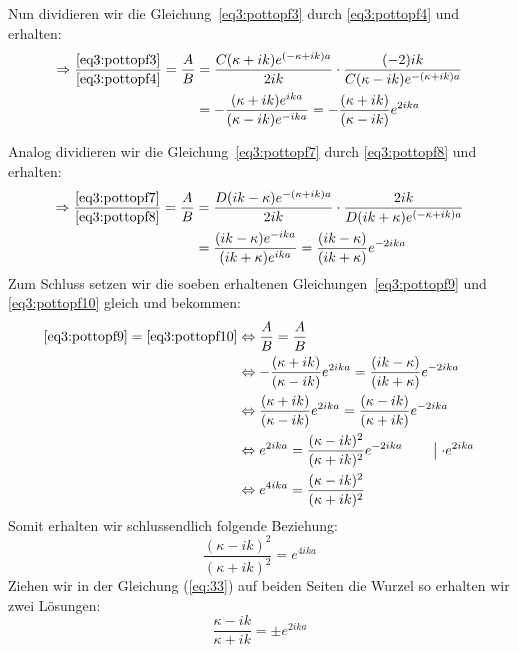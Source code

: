 Nun dividieren wir die Gleichung~\eqref{eq3:pottopf3} durch \eqref{eq3:pottopf4}
und erhalten:
\begin{align}
    \Rightarrow
    \frac{\eqref{eq3:pottopf3}}{\eqref{eq3:pottopf4}} 
    = \frac A B
    &=\frac{C(\kappa+ik)e^{(-\kappa +ik)a}}{2ik} \cdot
    \frac{(-2)ik}{C(\kappa-ik)e^{-(\kappa+ik)a}}\label{eq3:pottopf9}\\
    &=-\frac{(\kappa+ik)e^{ika}}{(\kappa-ik)e^{-ika}}
    =-\frac{(\kappa+ik)}{(\kappa-ik)}e^{2ika}\notag
\end{align}

Analog dividieren wir die Gleichung~\eqref{eq3:pottopf7} durch
\eqref{eq3:pottopf8} und erhalten:
\begin{align}
    \Rightarrow
    \frac{\eqref{eq3:pottopf7}}{\eqref{eq3:pottopf8}} 
    = \frac A B
    &=\frac{D(ik-\kappa)e^{-(\kappa +ik)a}}{2ik} \cdot
    \frac{2ik}{D(ik+\kappa)e^{(-\kappa+ik)a}}\label{eq3:pottopf10}\\
    &=\frac{(ik-\kappa)e^{-ika}}{(ik+\kappa)e^{ika}}
    =\frac{(ik-\kappa)}{(ik+\kappa)}e^{-2ika}\notag
\end{align}
Zum Schluss setzen wir die soeben erhaltenen Gleichungen~\eqref{eq3:pottopf9}
und \eqref{eq3:pottopf10} gleich und bekommen:
\begin{align*}
  \eqref{eq3:pottopf9}=\eqref{eq3:pottopf10}
  &\Leftrightarrow \frac A B = \frac A B\\
   &\Leftrightarrow -\frac{(\kappa+ik)}{(\kappa-ik)}e^{2ika}
      = \frac{(ik-\kappa)}{(ik+\kappa)}e^{-2ika}\\
   &\Leftrightarrow \frac{(\kappa+ik)}{(\kappa-ik)}e^{2ika}
      = \frac{(\kappa-ik)}{(\kappa+ik)}e^{-2ika}\\
   &\Leftrightarrow e^{2ika}
   = \frac{(\kappa-ik)^2}{(\kappa+ik)^2}e^{-2ika}
   \qquad \left|\;\cdot e^{2ika}\right.\\
   &\Leftrightarrow e^{4ika}
   = \frac{(\kappa-ik)^2}{(\kappa+ik)^2}
\end{align*}
Somit erhalten wir schlussendlich folgende Beziehung:
\begin{equation}
  \label{eq:33}
  \frac{(\kappa-ik)^2}{(\kappa+ik)^2}=e^{4ika}
\end{equation}
Ziehen wir in der Gleichung (\ref{eq:33}) auf beiden Seiten die Wurzel so
erhalten wir zwei Lösungen:
\begin{equation}
  \label{eq:34}
  \boxed{\frac{\kappa-ik}{\kappa+ik}=\pm e^{2ika}}
\end{equation}

